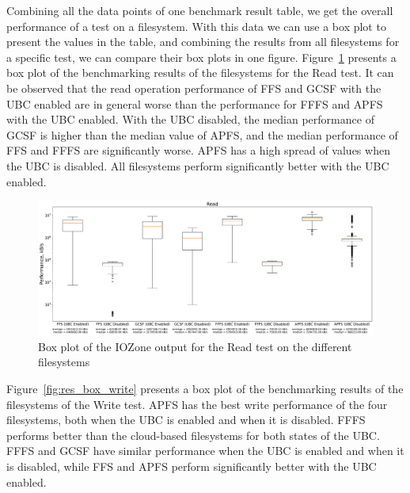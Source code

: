 

Combining all the data points of one benchmark result table, we get the overall performance of a test on a filesystem. With this data we can use a box plot to present the values in the table, and combining the results from all filesystems for a specific test, we can compare their box plots in one figure. Figure~\ref{fig:res_box_read} presents a box plot of the benchmarking results of the filesystems for the Read test. It can be observed that the read operation performance of \gls{FFS} and \gls{GCSF} with the \gls{UBC} enabled are in general worse than the performance for \gls{FFFS} and \gls{APFS} with the \gls{UBC} enabled. With the \gls{UBC} disabled, the median performance of \gls{GCSF} is higher than the median value of \gls{APFS}, and the median performance of \gls{FFS} and \gls{FFFS} are significantly worse. \gls{APFS} has a high spread of values when the \gls{UBC} is disabled. All filesystems perform significantly better with the \gls{UBC} enabled.

\begin{figure}[!ht]
	\label{fig:res_box_read}
	\begin{center}
		\includegraphics[width=1.0\textwidth]{figures.nosync/benchmarking/Read-boxplot.pdf}
	\end{center}
	\caption{Box plot of the IOZone output for the Read test on the different filesystems}
\end{figure}

\FloatBarrier

Figure~\ref{fig:res_box_write} presents a box plot of the benchmarking results of the filesystems of the Write test. \gls{APFS} has the best write performance of the four filesystems, both when the \gls{UBC} is enabled and when it is disabled. \gls{FFFS} performs better than the \mbox{cloud-based} filesystems for both states of the \gls{UBC}. \gls{FFFS} and \gls{GCSF} have similar performance when the \gls{UBC} is enabled and when it is disabled, while \gls{FFS} and \gls{APFS} perform significantly better with the \gls{UBC} enabled.

